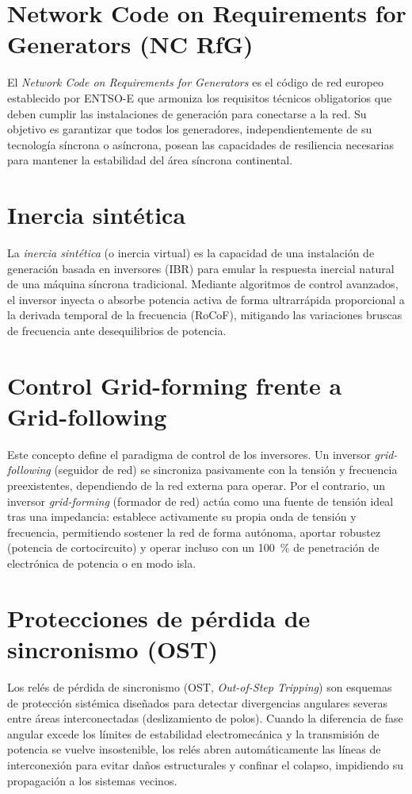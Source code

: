 \section{Network Code on Requirements for Generators (NC RfG)}
\label{anexo:nc_rfg}
El \textit{Network Code on Requirements for Generators} es el código de red europeo establecido por ENTSO-E que armoniza los requisitos técnicos obligatorios que deben cumplir las instalaciones de generación para conectarse a la red. Su objetivo es garantizar que todos los generadores, independientemente de su tecnología síncrona o asíncrona, posean las capacidades de resiliencia necesarias para mantener la estabilidad del área síncrona continental.

\section{Inercia sintética}
\label{anexo:inercia_sintetica}
La \textit{inercia sintética} (o inercia virtual) es la capacidad de una instalación de generación basada en inversores (IBR) para emular la respuesta inercial natural de una máquina síncrona tradicional. Mediante algoritmos de control avanzados, el inversor inyecta o absorbe potencia activa de forma ultrarrápida proporcional a la derivada temporal de la frecuencia (RoCoF), mitigando las variaciones bruscas de frecuencia ante desequilibrios de potencia.

\section{Control Grid-forming frente a Grid-following}
\label{anexo:grid_forming}
Este concepto define el paradigma de control de los inversores. Un inversor \textit{grid-following} (seguidor de red) se sincroniza pasivamente con la tensión y frecuencia preexistentes, dependiendo de la red externa para operar. Por el contrario, un inversor \textit{grid-forming} (formador de red) actúa como una fuente de tensión ideal tras una impedancia: establece activamente su propia onda de tensión y frecuencia, permitiendo sostener la red de forma autónoma, aportar robustez (potencia de cortocircuito) y operar incluso con un 100~\% de penetración de electrónica de potencia o en modo isla.

\section{Protecciones de pérdida de sincronismo (OST)}
\label{anexo:ost}
Los relés de pérdida de sincronismo (OST, \textit{Out-of-Step Tripping}) son esquemas de protección sistémica diseñados para detectar divergencias angulares severas entre áreas interconectadas (deslizamiento de polos). Cuando la diferencia de fase angular excede los límites de estabilidad electromecánica y la transmisión de potencia se vuelve insostenible, los relés abren automáticamente las líneas de interconexión para evitar daños estructurales y confinar el colapso, impidiendo su propagación a los sistemas vecinos.
